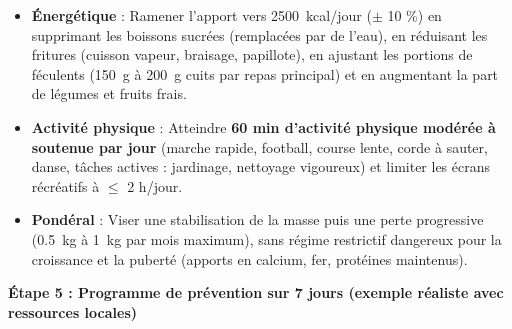 \documentclass[11pt]{article}
\begin{document}
\begin{exoresolu}
\begin{itemize}
\item \textbf{Énergétique} : Ramener l'apport vers \SI{2500}{kcal/jour} ($\pm$ 10 \%) en supprimant les boissons sucrées (remplacées par de l'eau), en réduisant les fritures (cuisson vapeur, braisage, papillote), en ajustant les portions de féculents (\SI{150}{g} à \SI{200}{g} cuits par repas principal) et en augmentant la part de légumes et fruits frais.
\item \textbf{Activité physique} : Atteindre \textbf{60 min d'activité physique modérée à soutenue par jour} (marche rapide, football, course lente, corde à sauter, danse, tâches actives : jardinage, nettoyage vigoureux) et limiter les écrans récréatifs à $\leq$ 2 h/jour.
\item \textbf{Pondéral} : Viser une stabilisation de la masse puis une perte progressive (\SI{0,5}{kg} à \SI{1}{kg} par mois maximum), sans régime restrictif dangereux pour la croissance et la puberté (apports en calcium, fer, protéines maintenus).
\end{itemize}

\textbf{Étape 5 : Programme de prévention sur 7 jours (exemple réaliste avec ressources locales)}


\end{exoresolu}
\end{document}

